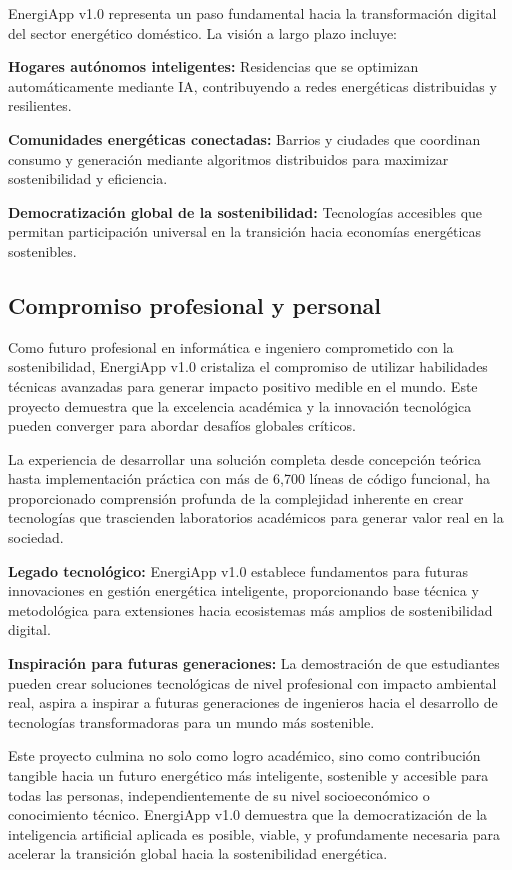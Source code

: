 EnergiApp v1.0 representa un paso fundamental hacia la transformación digital del sector energético doméstico. La visión a largo plazo incluye:

\textbf{Hogares autónomos inteligentes:} Residencias que se optimizan automáticamente mediante IA, contribuyendo a redes energéticas distribuidas y resilientes.

\textbf{Comunidades energéticas conectadas:} Barrios y ciudades que coordinan consumo y generación mediante algoritmos distribuidos para maximizar sostenibilidad y eficiencia.

\textbf{Democratización global de la sostenibilidad:} Tecnologías accesibles que permitan participación universal en la transición hacia economías energéticas sostenibles.

\subsection{Compromiso profesional y personal}

Como futuro profesional en informática e ingeniero comprometido con la sostenibilidad, EnergiApp v1.0 cristaliza el compromiso de utilizar habilidades técnicas avanzadas para generar impacto positivo medible en el mundo. Este proyecto demuestra que la excelencia académica y la innovación tecnológica pueden converger para abordar desafíos globales críticos.

La experiencia de desarrollar una solución completa desde concepción teórica hasta implementación práctica con más de 6,700 líneas de código funcional, ha proporcionado comprensión profunda de la complejidad inherente en crear tecnologías que trascienden laboratorios académicos para generar valor real en la sociedad.

\textbf{Legado tecnológico:} EnergiApp v1.0 establece fundamentos para futuras innovaciones en gestión energética inteligente, proporcionando base técnica y metodológica para extensiones hacia ecosistemas más amplios de sostenibilidad digital.

\textbf{Inspiración para futuras generaciones:} La demostración de que estudiantes pueden crear soluciones tecnológicas de nivel profesional con impacto ambiental real, aspira a inspirar a futuras generaciones de ingenieros hacia el desarrollo de tecnologías transformadoras para un mundo más sostenible.

Este proyecto culmina no solo como logro académico, sino como contribución tangible hacia un futuro energético más inteligente, sostenible y accesible para todas las personas, independientemente de su nivel socioeconómico o conocimiento técnico. EnergiApp v1.0 demuestra que la democratización de la inteligencia artificial aplicada es posible, viable, y profundamente necesaria para acelerar la transición global hacia la sostenibilidad energética.

